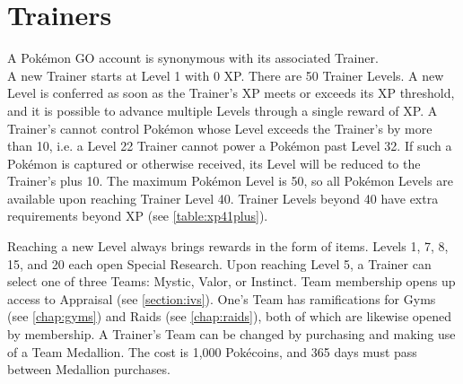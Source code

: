 \chapter{Trainers}
A Pokémon GO account is synonymous with its associated Trainer.\\

A new Trainer starts at Level 1 with 0 XP.
There are 50 Trainer Levels.
A new Level is conferred as soon as the Trainer's XP meets or exceeds
  its XP threshold, and it is possible to advance multiple Levels
  through a single reward of XP.
A Trainer's cannot control Pokémon whose Level exceeds the Trainer's by more than 10,
  i.e. a Level 22 Trainer cannot power a Pokémon past Level 32.
If such a Pokémon is captured or otherwise received, its Level will be
  reduced to the Trainer's plus 10.
The maximum Pokémon Level is 50, so all Pokémon Levels are available upon
  reaching Trainer Level 40.
Trainer Levels beyond 40 have extra requirements beyond XP (see \autoref{table:xp41plus}).

Reaching a new Level always brings rewards in the form of items.
Levels 1, 7, 8, 15, and 20 each open Special Research.
Upon reaching Level 5, a Trainer can select one of three Teams:
 Mystic, Valor, or Instinct.
Team membership opens up access to Appraisal (see \autoref{section:ivs}).
One's Team has ramifications for Gyms (see \autoref{chap:gyms}) and Raids (see \autoref{chap:raids}),
  both of which are likewise opened by membership.
A Trainer's Team can be changed by purchasing and making use of a Team Medallion.
The cost is 1,000 Pokécoins, and 365 days must pass between Medallion purchases.

